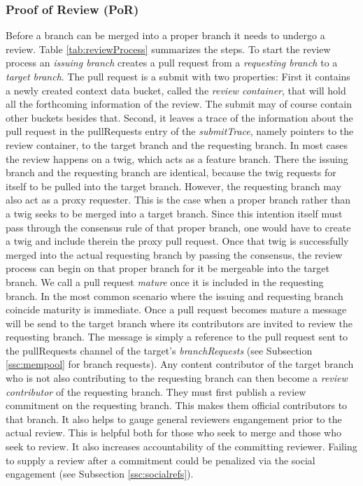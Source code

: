 \documentclass[14pt]{article}
\begin{document}
\subsubsection{Proof of Review (PoR)}
\label{ssc:por}

Before a branch can be merged into a proper branch it needs to undergo a review. Table \ref{tab:reviewProcess} summarizes the steps.
To start the review process an \textit{issuing branch} creates a pull request from a \textit{requesting branch} to a \textit{target branch}. The pull request is a submit with two properties: First it contains a newly created context data bucket, called the \textit{review container}, that will hold all the forthcoming information of the review. The submit may of course contain other buckets besides that. Second, it leaves a trace of the information about the pull request in the pullRequests entry of the \textit{submitTrace}, namely pointers to the review container, to the target branch and the requesting branch. In most cases the review happens on a twig, which acts as a feature branch. There the issuing branch and the requesting branch are identical, because the twig requests for itself to be pulled into the target branch. However, the requesting branch may also act as a proxy requester. This is the case when a proper branch rather than a twig seeks to be merged into a target branch. Since this intention itself must pass through the consensus rule of that proper branch, one would have to create a twig and include therein the proxy pull request. Once that twig is successfully merged into the actual requesting branch by passing the consensus, the review process can begin on that proper branch for it be mergeable into the target branch. We call a pull request \textit{mature} once it is included in the requesting branch. In the most common scenario where the issuing and requesting branch coincide maturity is immediate. 
Once a pull request becomes mature a message will be send to the target branch  where its contributors are invited to review the requesting branch. The message is simply a reference to the pull request sent to the pullRequests channel of the target's \textit{branchRequests} (see Subsection \ref{ssc:mempool} for branch requests).
Any content contributor of the target branch who is not also contributing to the requesting branch can then become a \textit{review contributor} of the requesting branch. They must first publish a review commitment on the requesting branch. This makes them official contributors to that branch. It also helps to gauge general reviewers engangement prior to the actual review. This is helpful both for those who seek to merge and those who seek to review. It also increases accountability of the committing reviewer. Failing to supply a review after a commitment could be penalized via the social engagement (see Subsection \ref{ssc:socialrefs}).  
\end{document}

